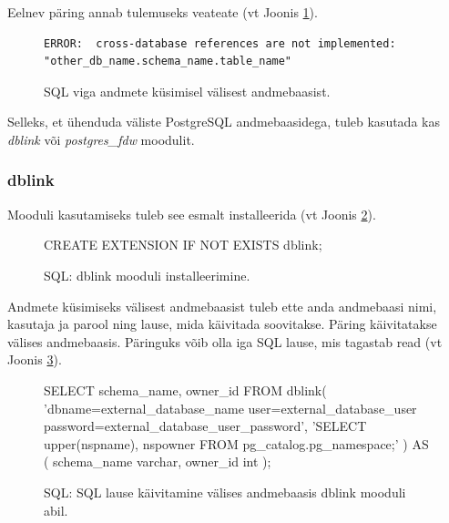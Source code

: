\documentclass[a4paper,12pt]{article} %
\begin{document}
Eelnev päring annab tulemuseks veateate (vt Joonis \ref{fig_sql_viga_andmete_küsimisel_välisest_andmebaasist}).
\begin{figure}[H]
\centering
\begin{lstlisting}
ERROR:  cross-database references are not implemented: "other_db_name.schema_name.table_name"
\end{lstlisting}
\caption{SQL viga andmete küsimisel välisest andmebaasist.}
\label{fig_sql_viga_andmete_küsimisel_välisest_andmebaasist}
\end{figure}

Selleks, et ühenduda väliste PostgreSQL andmebaasidega, tuleb kasutada kas \textit{dblink} või \textit{postgres\_fdw} moodulit.

\subsubsection{dblink}
\label{dblink}
Mooduli kasutamiseks tuleb see esmalt installeerida (vt Joonis \ref{fig_sql_dblink_mooduli_installeerimine}).
\begin{figure}[H]
\centering
\begin{SQL}
CREATE EXTENSION IF NOT EXISTS dblink;
\end{SQL}
\caption{SQL: dblink mooduli installeerimine.}
\label{fig_sql_dblink_mooduli_installeerimine}
\end{figure}
Andmete küsimiseks välisest andmebaasist tuleb ette anda andmebaasi nimi, kasutaja ja parool ning lause, mida käivitada soovitakse. Päring käivitatakse välises andmebaasis. Päringuks võib olla iga SQL lause, mis tagastab read (vt Joonis \ref{fig_sql_sql_lause_käivitamine_välises_andmebaasis_dblink_mooduli_abil}). \cite{PostgreSQLdblink}
\begin{figure}[H]
\centering
\begin{SQL}
SELECT schema_name, owner_id
FROM dblink(
  'dbname=external_database_name user=external_database_user password=external_database_user_password',
  'SELECT upper(nspname), nspowner FROM pg_catalog.pg_namespace;'
) AS (
  schema_name varchar,
  owner_id int
);
\end{SQL}
\caption{SQL: SQL lause käivitamine välises andmebaasis dblink mooduli abil.}
\label{fig_sql_sql_lause_käivitamine_välises_andmebaasis_dblink_mooduli_abil}
\end{figure}
\end{document}
